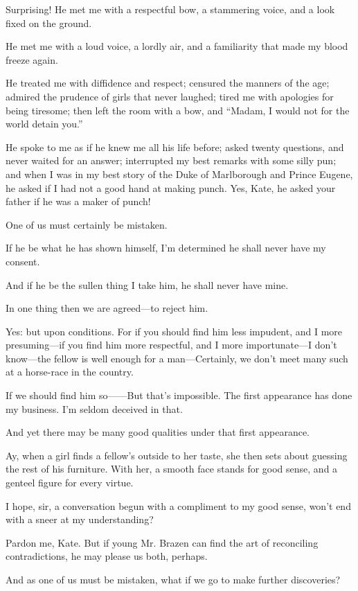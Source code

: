 \documentclass{book}
\begin{document}
\8  Surprising!  He met me with a respectful bow, a
stammering voice, and a look fixed on the ground.

\3  He met me with a loud voice, a lordly air, and a
familiarity that made my blood freeze again.

\8  He treated me with diffidence and respect; censured
the manners of the age; admired the prudence of girls that never
laughed; tired me with apologies for being tiresome; then left the room
with a bow, and ``Madam, I would not for the world detain you.''

\3  He spoke to me as if he knew me all his life before;
asked twenty questions, and never waited for an answer; interrupted my
best remarks with some silly pun; and when I was in my best story of
the Duke of Marlborough and Prince Eugene, he asked if I had not a good
hand at making punch.  Yes, Kate, he asked your father if he was a
maker of punch!

\8  One of us must certainly be mistaken.

\3  If he be what he has shown himself, I'm determined he
shall never have my consent.

\8  And if he be the sullen thing I take him, he shall
never have mine.

\3  In one thing then we are agreed---to reject him.

\8  Yes: but upon conditions.  For if you should find him
less impudent, and I more presuming---if you find him more respectful,
and I more importunate---I don't know---the fellow is well enough for a
man---Certainly, we don't meet many such at a horse-race in the country.

\3  If we should find him so------But that's impossible.  The
first appearance has done my business.  I'm seldom deceived in that.

\8  And yet there may be many good qualities under that
first appearance.

\3  Ay, when a girl finds a fellow's outside to her taste, she
then sets about guessing the rest of his furniture.  With her, a smooth
face stands for good sense, and a genteel figure for every virtue.

\8  I hope, sir, a conversation begun with a compliment
to my good sense, won't end with a sneer at my understanding?

\3  Pardon me, Kate.  But if young Mr. Brazen can find the art
of reconciling contradictions, he may please us both, perhaps.

\8  And as one of us must be mistaken, what if we go to
make further discoveries?
\end{document}

